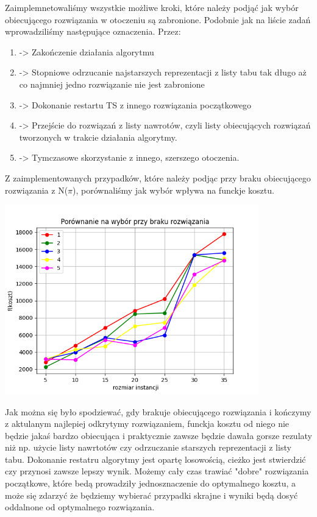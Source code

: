 \documentclass{article}
\begin{document}
    Zaimplemnetowaliśmy wszystkie możliwe kroki, które należy podjąć
    jak wybór obiecującego rozwiązania w otoczeniu są zabronione. Podobnie
    jak na liście zadań wprowadziliśmy następujące oznaczenia. Przez:

    \begin{enumerate}
        \item -> Zakończenie działania algorytmu
        \item -> Stopniowe odrzucanie najstarszych reprezentacji z 
                 listy tabu tak długo aż co najmniej jedno rozwiązanie 
                 nie jest zabronione
        \item -> Dokonanie restartu TS z innego rozwiązania początkowego
        \item -> Przejście do rozwiązań z listy nawrotów, czyli listy 
                 obiecujących rozwiązań tworzonych w trakcie działania algorytmy.
        \item -> Tymczasowe skorzystanie z innego, szerszego otoczenia.
    \end{enumerate}
 
    Z zaimplementowanych przypadków, które należy podjąc przy braku obiecującego
    rozwiązania z N($\pi$), porównaliśmy jak wybór wpływa na funckje kosztu.

    \includegraphics[width=11cm]{./spr2img/Figure_9.png}

    Jak można się było spodziewać, gdy brakuje obiecującego rozwiązania 
    i kończymy z aktulanym najlepiej odkrytymy rozwiązaniem, funckja kosztu
    od niego nie będzie jakaś bardzo obiecująca i praktycznie zawsze będzie
    dawała gorsze rezulaty niż np. użycie listy nawrtotów czy odrzuczanie
    starszych reprezentacji z listy tabu. Dokonanie restatru algorytmy jest
    opartę losowością, cieżko jest stwierdzić czy przynosi zawsze lepszy wynik.
    Możemy cały czas trawiać "dobre" rozwiązania początkowe, które bedą prowadziły
    jednosznaczenie do optymalnego kosztu, a może się zdarzyć że będziemy 
    wybierać przypadki skrajne i wyniki będą dosyć oddalnone od optymalnego 
    rozwiązania.
\end{document}
